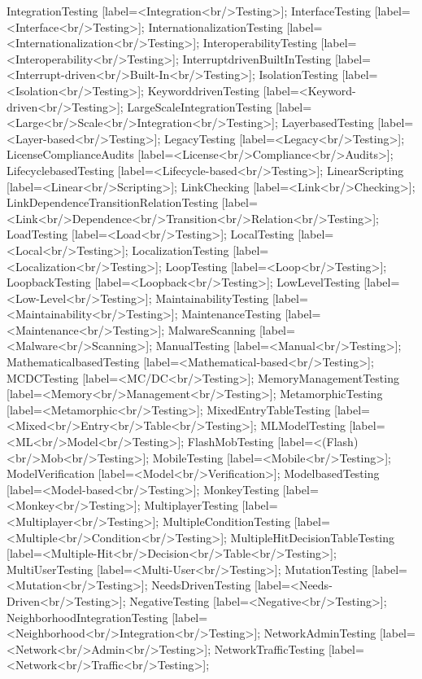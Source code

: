 \documentclass{article}
\begin{document}
{IntegrationTesting [label=<Integration<br/>Testing>];
InterfaceTesting [label=<Interface<br/>Testing>];
InternationalizationTesting [label=<Internationalization<br/>Testing>];
InteroperabilityTesting [label=<Interoperability<br/>Testing>];
InterruptdrivenBuiltInTesting [label=<Interrupt-driven<br/>Built-In<br/>Testing>];
IsolationTesting [label=<Isolation<br/>Testing>];
KeyworddrivenTesting [label=<Keyword-driven<br/>Testing>];
LargeScaleIntegrationTesting [label=<Large<br/>Scale<br/>Integration<br/>Testing>];
LayerbasedTesting [label=<Layer-based<br/>Testing>];
LegacyTesting [label=<Legacy<br/>Testing>];
LicenseComplianceAudits [label=<License<br/>Compliance<br/>Audits>];
LifecyclebasedTesting [label=<Lifecycle-based<br/>Testing>];
LinearScripting [label=<Linear<br/>Scripting>];
LinkChecking [label=<Link<br/>Checking>];
LinkDependenceTransitionRelationTesting [label=<Link<br/>Dependence<br/>Transition<br/>Relation<br/>Testing>];
LoadTesting [label=<Load<br/>Testing>];
LocalTesting [label=<Local<br/>Testing>];
LocalizationTesting [label=<Localization<br/>Testing>];
LoopTesting [label=<Loop<br/>Testing>];
LoopbackTesting [label=<Loopback<br/>Testing>];
LowLevelTesting [label=<Low-Level<br/>Testing>];
MaintainabilityTesting [label=<Maintainability<br/>Testing>];
MaintenanceTesting [label=<Maintenance<br/>Testing>];
MalwareScanning [label=<Malware<br/>Scanning>];
ManualTesting [label=<Manual<br/>Testing>];
MathematicalbasedTesting [label=<Mathematical-based<br/>Testing>];
MCDCTesting [label=<MC/DC<br/>Testing>];
MemoryManagementTesting [label=<Memory<br/>Management<br/>Testing>];
MetamorphicTesting [label=<Metamorphic<br/>Testing>];
MixedEntryTableTesting [label=<Mixed<br/>Entry<br/>Table<br/>Testing>];
MLModelTesting [label=<ML<br/>Model<br/>Testing>];
FlashMobTesting [label=<(Flash)<br/>Mob<br/>Testing>];
MobileTesting [label=<Mobile<br/>Testing>];
ModelVerification [label=<Model<br/>Verification>];
ModelbasedTesting [label=<Model-based<br/>Testing>];
MonkeyTesting [label=<Monkey<br/>Testing>];
MultiplayerTesting [label=<Multiplayer<br/>Testing>];
MultipleConditionTesting [label=<Multiple<br/>Condition<br/>Testing>];
MultipleHitDecisionTableTesting [label=<Multiple-Hit<br/>Decision<br/>Table<br/>Testing>];
MultiUserTesting [label=<Multi-User<br/>Testing>];
MutationTesting [label=<Mutation<br/>Testing>];
NeedsDrivenTesting [label=<Needs-Driven<br/>Testing>];
NegativeTesting [label=<Negative<br/>Testing>];
NeighborhoodIntegrationTesting [label=<Neighborhood<br/>Integration<br/>Testing>];
NetworkAdminTesting [label=<Network<br/>Admin<br/>Testing>];
NetworkTrafficTesting [label=<Network<br/>Traffic<br/>Testing>];
}
\end{document}
